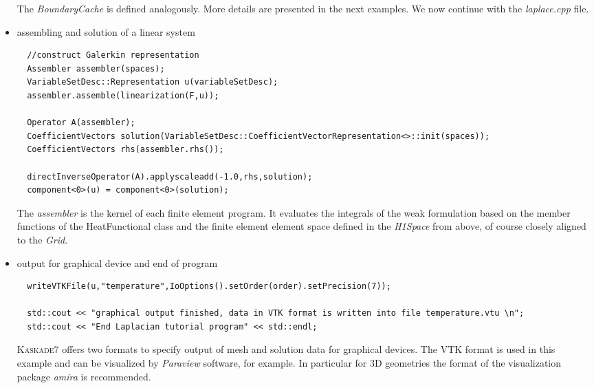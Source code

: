 \documentclass[11pt]{article}
\newcommand{\K}{\textsc{Kaskade7 }}
\begin{document}
\begin{itemize}
The {\em BoundaryCache} is defined analogously.
More details are presented in the next examples.
We now continue with the \emph{laplace.cpp} file.


\item assembling and solution of a linear system
\begin{lstlisting}
  //construct Galerkin representation
  Assembler assembler(spaces);
  VariableSetDesc::Representation u(variableSetDesc);
  assembler.assemble(linearization(F,u));

  Operator A(assembler);
  CoefficientVectors solution(VariableSetDesc::CoefficientVectorRepresentation<>::init(spaces));
  CoefficientVectors rhs(assembler.rhs());

  directInverseOperator(A).applyscaleadd(-1.0,rhs,solution);
  component<0>(u) = component<0>(solution);
\end{lstlisting}

The {\em assembler} is the kernel of each finite element program. It evaluates
the integrals of the weak formulation based on the member functions of the HeatFunctional
class and the finite element element space defined in the {\em H1Space} from above, of course
closely aligned to the {\em Grid}.

\item output for graphical device and end of program
\begin{lstlisting}
  writeVTKFile(u,"temperature",IoOptions().setOrder(order).setPrecision(7));

  std::cout << "graphical output finished, data in VTK format is written into file temperature.vtu \n";
  std::cout << "End Laplacian tutorial program" << std::endl;
\end{lstlisting}

\K offers two formats to specify output of mesh and solution data for graphical devices.
The VTK format is used in this example and can be visualized  by {\em Paraview} software, for example.
In particular for 3D geometries the format of the visualization package {\em amira} is
recommended.

\end{itemize}
\end{document}
